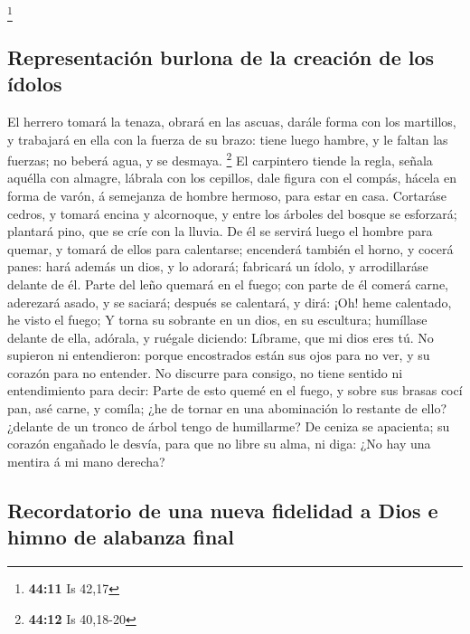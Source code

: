 \footnote{\textbf{44:11} Is 42,17}

\hypertarget{representaciuxf3n-burlona-de-la-creaciuxf3n-de-los-uxeddolos}{%
\subsection{Representación burlona de la creación de los
ídolos}\label{representaciuxf3n-burlona-de-la-creaciuxf3n-de-los-uxeddolos}}

 El herrero tomará la tenaza, obrará en las ascuas,
darále forma con los martillos, y trabajará en ella con la fuerza de su
brazo: tiene luego hambre, y le faltan las fuerzas; no beberá agua, y se
desmaya. \footnote{\textbf{44:12} Is 40,18-20}  El
carpintero tiende la regla, señala aquélla con almagre, lábrala con los
cepillos, dale figura con el compás, hácela en forma de varón, á
semejanza de hombre hermoso, para estar en casa. 
Cortaráse cedros, y tomará encina y alcornoque, y entre los árboles del
bosque se esforzará; plantará pino, que se críe con la lluvia.
 De él se servirá luego el hombre para quemar, y tomará
de ellos para calentarse; encenderá también el horno, y cocerá panes:
hará además un dios, y lo adorará; fabricará un ídolo, y arrodillaráse
delante de él.  Parte del leño quemará en el fuego; con
parte de él comerá carne, aderezará asado, y se saciará; después se
calentará, y dirá: ¡Oh! heme calentado, he visto el fuego;
 Y torna su sobrante en un dios, en su escultura;
humíllase delante de ella, adórala, y ruégale diciendo: Líbrame, que mi
dios eres tú.  No supieron ni entendieron: porque
encostrados están sus ojos para no ver, y su corazón para no entender.
 No discurre para consigo, no tiene sentido ni
entendimiento para decir: Parte de esto quemé en el fuego, y sobre sus
brasas cocí pan, asé carne, y comíla; ¿he de tornar en una abominación
lo restante de ello? ¿delante de un tronco de árbol tengo de humillarme?
 De ceniza se apacienta; su corazón engañado le desvía,
para que no libre su alma, ni diga: ¿No hay una mentira á mi mano
derecha?

\hypertarget{recordatorio-de-una-nueva-fidelidad-a-dios-e-himno-de-alabanza-final}{%
\subsection{Recordatorio de una nueva fidelidad a Dios e himno de
alabanza
final}\label{recordatorio-de-una-nueva-fidelidad-a-dios-e-himno-de-alabanza-final}}


